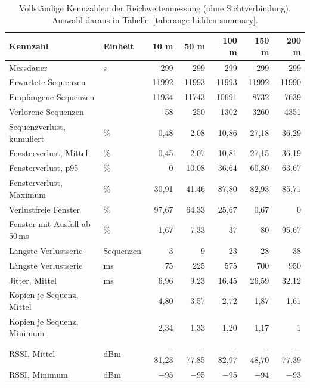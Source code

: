\begin{table}[htbp]
  \centering
  \small
  \begin{tabular}{llrrrrr}
    \toprule
    Kennzahl & Einheit & 10 m & 50 m & 100 m & 150 m & 200 m \\
    \midrule
    Messdauer & s & 299 & 299 & 299 & 299 & 299 \\
    Erwartete Sequenzen &  & 11992 & 11993 & 11993 & 11992 & 11990 \\
    Empfangene Sequenzen &  & 11934 & 11743 & 10691 & 8732 & 7639 \\
    Verlorene Sequenzen &  & 58 & 250 & 1302 & 3260 & 4351 \\
    Sequenzverlust, kumuliert & \% & 0,48 & 2,08 & 10,86 & 27,18 & 36,29 \\
    Fensterverlust, Mittel & \% & 0,45 & 2,07 & 10,81 & 27,15 & 36,19 \\
    Fensterverlust, p95 & \% & 0 & 10,08 & 36,64 & 60,80 & 63,67 \\
    Fensterverlust, Maximum & \% & 30,91 & 41,46 & 87,80 & 82,93 & 85,71 \\
    Verlustfreie Fenster & \% & 97,67 & 64,33 & 25,67 & 0,67 & 0 \\
    Fenster mit Ausfall ab 50\,ms & \% & 1,67 & 7,33 & 37 & 80 & 95,67 \\
    Längste Verlustserie & Sequenzen & 3 & 9 & 23 & 28 & 38 \\
    Längste Verlustserie & ms & 75 & 225 & 575 & 700 & 950 \\
    Jitter, Mittel & ms & 6,96 & 9,23 & 16,45 & 26,59 & 32,12 \\
    Kopien je Sequenz, Mittel &  & 4,80 & 3,57 & 2,72 & 1,87 & 1,61 \\
    Kopien je Sequenz, Minimum &  & 2,34 & 1,33 & 1,20 & 1,17 & 1 \\
    RSSI, Mittel & dBm & $-$81,23 & $-$77,85 & $-$82,97 & $-$48,70 & $-$77,39 \\
    RSSI, Minimum & dBm & $-$95 & $-$95 & $-$95 & $-$94 & $-$93 \\
    \bottomrule
\end{tabular}
\caption{Vollständige Kennzahlen der Reichweitenmessung (ohne Sichtverbindung). Auswahl daraus in Tabelle~\ref{tab:range-hidden-summary}.}
  \label{tab:range-hidden-full}
\end{table}
